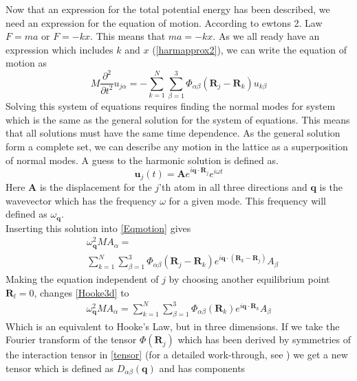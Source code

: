 Now that an expression for the total potential energy has been described, we need an expression for the equation of motion. According to ewtons 2. Law $F=ma$ or $F=-kx$. This means that $ma=-kx$. As we all ready have an expression which includes $k$ and $x$ (\cref{harmapprox2}), we can write the equation of motion as 
\begin{equation}
    M\dfrac{\partial^{2}}{\partial
    t^{2}}u_{j\alpha}=-\sum_{k=1}^{N}\sum_{\beta=1}^{3}\Phi_{\alpha\beta}(\mathbf{R}_{j}-\mathbf{R}_{k})u_{k\beta}\label{Eqmotion}
\end{equation}
Solving this system of equations requires finding the normal modes for system which is the same as the general solution for the system of equations. This means that all solutions must have the same time dependence. As the general solution form a complete set, we can describe any motion in the lattice as a superposition of normal modes. A guess to the harmonic solution is defined as.
\begin{equation}
    \mathbf{u}_{j}(t)=\mathbf{A}e^{i\mathbf{q}\cdot\mathbf{R}_{j}}e^{i\omega t}
\end{equation}
Here $\mathbf{A}$ is the displacement for the $j$'th atom in all three directions and $\mathbf{q}$ is the wavevector which has the frequency $\omega$ for a given mode. This frequency will defined as $\omega_{\mathbf{q}}$.\\ Inserting this solution into \cref{Eqmotion} gives
\begin{align}
&\omega_{\mathbf{q}}^{2}MA_{\alpha}=\nonumber\\
&\sum_{k=1}^{N}\sum_{\beta=1}^{3}\Phi_{\alpha\beta}(\mathbf{R}_{j}-\mathbf{R}_{k})e^{i\mathbf{q}\cdot(\mathbf{R}_{k}-\mathbf{R}_{j})}A_{\beta}\label{Hooke3d}
\end{align}
Making the equation independent of $j$ by choosing another equilibrium point $\mathbf{R}_{l}=0$, changes \cref{Hooke3d} to
\begin{align}
\omega_{\mathbf{q}}^{2}MA_{\alpha}=\sum_{k=1}^{N}\sum_{\beta=1}^{3}\Phi_{\alpha\beta}(\mathbf{R}_{k})e^{i\mathbf{q}\cdot\mathbf{R}_{k}}A_{\beta}\label{Hooke3dnew}
\end{align}
Which is an equivalent to Hooke's Law, but in three dimensions. If we take the Fourier transform of the tensor $\Phi(\mathbf{R}_{j})$ which has been derived by symmetries of the interaction tensor in \cref{tensor} (for a detailed work-through, see ) we get a new tensor which is defined as $D_{\alpha\beta}(\mathbf{q})$ and has components
